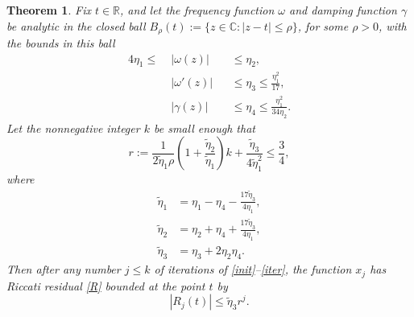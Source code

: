 \documentclass[10pt]{article}
\newcommand{\be}{\begin{equation}}
\newcommand{\ee}{\end{equation}}
\newcommand{\C}{\mathbb{C}}
\newcommand{\R}{\mathbb{R}}
\newtheorem{thm}{Theorem}
\newcommand{\om}{\omega}
\newcommand{\g}{\gamma}
\newcommand{\te}{\tilde\eta}
\begin{document}
\begin{thm}\label{TR}   
  Fix $t\in\R$, and let the frequency function $\om$ and damping function $\g$ be analytic
  in the closed ball $B_\rho(t) := \{z\in\C : |z-t| \le \rho\}$,
  for some $\rho>0$, with the bounds in this ball
    \begin{alignat}{4}
        \eta_1 \leq \; &|\om(z)| && \leq \eta_2,          \label{ommag} \\
         &|\om'(z)| &&\leq \eta_3 \leq \frac{\eta_1^2}{17}, \label{omder} \\
         &|\g(z)| &&\leq \eta_4 \leq \frac{\eta_1^2}{34\eta_2}. \label{gammaupper}
  \end{alignat}
  Let the nonnegative integer $k$ be small enough that
  \be
    r := \frac{1}{2\te_1 \rho} \left(1 + \frac{\te_2}{\te_1}\right) k + \frac{\te_3}{4\te_1^2} \leq \frac{3}{4},
  \label{r}
  \ee
  where
    \begin{align}
    \te_1 &= \eta_1 - \eta_4 - \frac{17 \te_3}{4 \eta_1},  \label{eta1} \\ 
    \te_2 &= \eta_2 + \eta_4 + \frac{17 \te_3}{4 \eta_1},   \label{eta2} \\
    \te_3 &= \eta_3 + 2\eta_2\eta_4. \label{eta3}
    \end{align}
  Then after any number $j\le k$ of iterations of \cref{init}--\cref{iter},
  the function $x_j$ has Riccati residual \cref{R} bounded at the point $t$ by
  \be
  |R_j(t)| \le \te_3 r^j. \label{Rjbnd}
  \ee
\end{thm}  %
\end{document}
